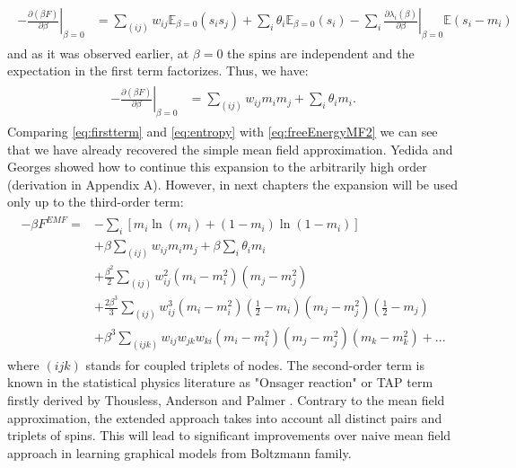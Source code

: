 \begin{align}
\begin{split}
 - \left. \frac{\partial (\beta F)}{\partial \beta}\right|_{\beta = 0} & =  \sum_{(ij)} w_{ij} \mathbb{E}_{\beta =0}(s_i s_j) + \sum_i \theta_i \mathbb{E}_{\beta =0}(s_i) - \sum_i  \left.\frac{\partial\lambda_i (\beta)}{\partial \beta}\right|_{\beta = 0}\mathbb{E}(s_i - m_i) 
 \end{split}
\end{align}
and as it was observed earlier, at $\beta =0$ the spins are independent and the expectation in the first term factorizes. Thus, we have:
\begin{align}
\begin{split}
 - \left. \frac{\partial (\beta F)}{\partial \beta}\right|_{\beta = 0} & =  \sum_{(ij)} w_{ij} m_i m_j +  \sum_i \theta_i m_i.
 \label{eq:firstterm} 
 \end{split}
\end{align}
Comparing \ref{eq:firstterm} and \ref{eq:entropy} with \ref{eq:freeEnergyMF2} we can see that we have already recovered the simple mean field approximation. Yedida and Georges \cite{georges1991expand} showed how to continue this expansion to the arbitrarily high order (derivation in Appendix A). However, in next chapters the expansion will be used only up to the third-order term:
\begin{align*}
\begin{split}
-\beta F^{EMF} = & - \sum_i \left[m_i\ln (m_i) +  (1 - m_i)\ln \left( 1-m_i \right)\right]  \\
& + \beta \sum_{(ij)} w_{ij} m_i m_j + \beta \sum_i \theta_i m_i\\
& + \frac{\beta^2}{2} \sum_{(ij)} w_{ij}^2 (m_i - m_i^2)(m_j-m_j^2)\\
& + \frac{2\beta^3}{3} \sum_{(ij)} w_{ij}^3 (m_i - m_i^2)(\frac{1}{2} - m_i)(m_j - m_j^2)(\frac{1}{2} - m_j)\\
& +\beta^3 \sum_{(ijk)} w_{ij}w_{jk}w_{ki} (m_i - m_i^2)(m_j - m_j^2)(m_k - m_k^2) + ...
\label{eq:EMFexpansion}
\end{split}
\end{align*}
where $(ijk)$ stands for coupled triplets of nodes. The second-order term is known in the statistical physics literature as "Onsager reaction" or TAP term firstly derived by Thousless, Anderson and Palmer \cite{thousless1977solution}. Contrary to the mean field approximation, the extended approach takes into account all distinct pairs and triplets of spins. This will lead to significant improvements over naive mean field approach
in learning graphical models from Boltzmann family.

